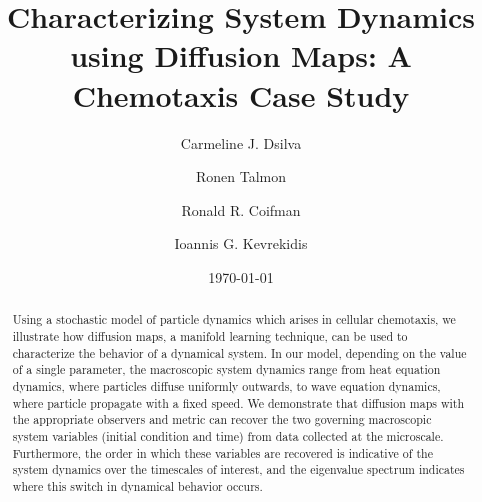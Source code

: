 \documentclass[prl, reprint, final, showkeys]{revtex4-1}
\begin{document}
\title{Characterizing System Dynamics using Diffusion Maps: A Chemotaxis Case Study}

\author{Carmeline J. Dsilva}

\author{Ronen Talmon}

\author{Ronald R. Coifman}

\author{Ioannis G. Kevrekidis}

\date{\today}

\begin{abstract}

Using a stochastic model of particle dynamics which arises in cellular chemotaxis, we illustrate how diffusion maps, a manifold learning technique, can be used to characterize the behavior of a dynamical system.
%
In our model, depending on the value of a single parameter, the macroscopic system dynamics range from heat equation dynamics, where particles diffuse uniformly outwards, to wave equation dynamics, where particle propagate with a fixed speed. 
%
We demonstrate that diffusion maps with the appropriate observers and metric can recover the two governing macroscopic system variables (initial condition and time) from data collected at the microscale. %
%
Furthermore, the order in which these variables are recovered is indicative of the system dynamics over the timescales of interest, 
and the eigenvalue spectrum indicates where this switch in dynamical behavior occurs.
%
%
%
%	
%

\end{abstract}
\end{document}
